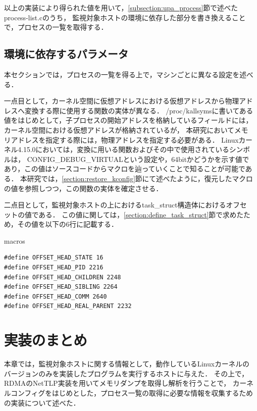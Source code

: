 
以上の実装により得られた値を用いて，\ref{subsection:upa_process}節で述べたprocess-list.cのうち，
監視対象ホストの環境に依存した部分を書き換えることで，プロセスの一覧を取得する．

\subsection{環境に依存するパラメータ}

本セクションでは，プロセスの一覧を得る上で，マシンごとに異なる設定を述べる．

一点目として，カーネル空間に仮想アドレスにおける仮想アドレスから物理アドレスへ変換する際に使用する関数の実体が異なる．
/proc/kallsymsに書いてある値をはじめとして，子プロセスの開始アドレスを格納しているフィールドには，カーネル空間における仮想アドレスが格納されているが，
本研究においてメモリアドレスを指定する際には，物理アドレスを指定する必要がある．
Linuxカーネル4.15.0においては，変換に用いる関数およびその中で使用されているシンボルは，
CONFIG_DEBUG_VIRTUALという設定や，64bitかどうかを示す値であり，この値はソースコードからマクロを辿っていくことで知ることが可能である．
本研究では，\ref{section:restore_kconfig}節にて述べたように，復元したマクロの値を参照しつつ，この関数の実体を確定させる．

二点目として，監視対象ホストの上におけるtask\_struct構造体におけるオフセットの値である．
この値に関しては，\ref{section:define_task_struct}節で求めたため，その値を以下の6行に記載する．

\begin{itembox}[l]{macros}
    \begin{verbatim}
#define OFFSET_HEAD_STATE 16
#define OFFSET_HEAD_PID 2216
#define OFFSET_HEAD_CHILDREN 2248
#define OFFSET_HEAD_SIBLING 2264
#define OFFSET_HEAD_COMM 2640
#define OFFSET_HEAD_REAL_PARENT 2232
    \end{verbatim}
\end{itembox}

\section{実装のまとめ}


本章では，監視対象ホストに関する情報として，動作しているLinuxカーネルのバージョンのみを実装したプログラムを実行するホストに与えた．
その上で，RDMAのNetTLP実装を用いてメモリダンプを取得し解析を行うことで，
カーネルコンフィグをはじめとした，プロセス一覧の取得に必要な情報を収集するための実装について述べた．
